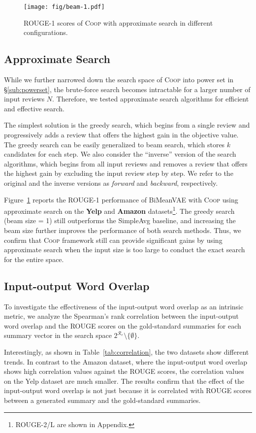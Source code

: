 \documentclass[11pt]{article}
\newcommand{\aggname}{\textsc{Coop}}
\newcommand{\name}{\mbox{\sc BiMeanVAE}}
\newcommand{\simpleavg}{\mbox{SimpleAvg}}
\newcommand{\yelp}{\mbox{\bf Yelp}}
\newcommand{\amazon}{\mbox{\bf Amazon}}
\newcommand{\hl}[1]{#1}
\begin{document}
\begin{figure}[t]
    \centering
    \texttt{[image: fig/beam-1.pdf]}
    \caption{ROUGE-1 scores of \aggname{} with approximate search in different configurations.}\label{fig:beam-1}
\end{figure}

\subsection{Approximate Search}
While we further narrowed down
the search space of \aggname{} into power set in \S\ref{sub:powerset}, the brute-force search becomes intractable for a larger number of input reviews $N$.
Therefore, we tested approximate search algorithms for efficient and effective search.

The simplest solution is the greedy search, which begins from a single review
and progressively adds a review that offers the highest gain in the objective value. The greedy search can be easily generalized to beam search, which stores $k$ candidates for each step.
We also consider the ``inverse'' version of the search algorithms, which begins from all input reviews and removes a review that offers the highest gain by excluding the input review step by step. We refer to the original and the inverse versions as
{\em forward} and {\em backward}, respectively.

Figure~\ref{fig:beam-1} reports the ROUGE-1 performance of \name{} with \aggname{} using approximate search on the \yelp{} and \amazon{} datasets\footnote{ROUGE-2/L are shown
in Appendix.}. The greedy search (beam size = 1) still outperforms the \simpleavg{} baseline, and increasing the beam size further improves the performance of both search methods. 
Thus, we confirm that \aggname{} framework still can provide significant gains by using approximate search when the input size is too large to conduct the exact search for the entire space.

\subsection{Input-output Word Overlap}
To investigate the effectiveness of the input-output word overlap as an intrinsic metric, we analyze the \hl{Spearman's rank} correlation between the input-output word overlap and the ROUGE scores on the gold-standard summaries for each summary vector in the search space $2^{\mathcal{R}_e}\setminus \{\emptyset\}$.

Interestingly, as shown in Table~\ref{tab:correlation}, the two datasets show different trends. In contrast to the Amazon dataset, where the input-output word overlap shows high correlation values against the ROUGE scores, the correlation values on the Yelp dataset are much smaller.
The results confirm that the effect of the input-output word overlap is not just because it is correlated with ROUGE scores between a generated summary and the gold-standard summaries.
\end{document}
